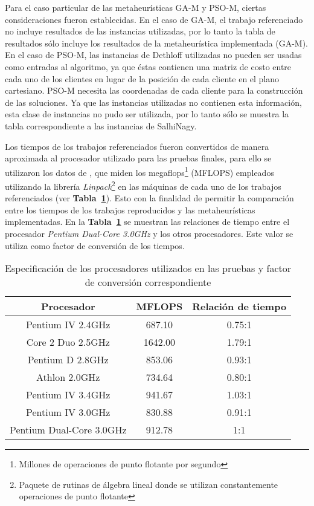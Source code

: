 Para el caso particular de las metaheurísticas GA-M y PSO-M, ciertas consideraciones fueron establecidas. En el caso de GA-M, el trabajo referenciado  no incluye resultados de las instancias utilizadas, por lo tanto la tabla de resultados sólo incluye los resultados de la metaheurística implementada (GA-M). En el caso de PSO-M, las instancias de Dethloff utilizadas no pueden ser usadas como entradas al algoritmo, ya que éstas contienen una matriz de costo entre cada uno de los clientes en lugar de la posición de cada cliente en el plano cartesiano. PSO-M necesita las coordenadas de cada cliente para la construcción de las soluciones. Ya que las instancias utilizadas no contienen esta información, esta clase de instancias no pudo ser utilizada, por lo tanto sólo se muestra la tabla correspondiente a las instancias de SalhiNagy.

Los tiempos de los trabajos referenciados fueron convertidos de manera aproximada al procesador utilizado para las pruebas finales, para ello se utilizaron los datos de \cite{website:maquinas}, que miden los megaflops\footnote{Millones de operaciones de punto flotante por segundo} (MFLOPS) empleados utilizando la librería \emph{Linpack}\footnote{Paquete de rutinas de álgebra lineal donde se utilizan constantemente operaciones de punto flotante} en las máquinas de cada uno de los trabajos re\-fe\-ren\-cia\-dos (ver \textbf{Tabla~\ref{table:comparacion-procesadores}}). Esto con la finalidad de permitir la comparación entre los tiempos de los trabajos reproducidos y las metaheurísticas implementadas. En la \textbf{Tabla~\ref{table:comparacion-procesadores}} se muestran las relaciones de tiempo entre el procesador \emph{Pentium Dual-Core 3.0GHz} y los otros procesadores. Este valor se utiliza como factor de conversión de los tiempos.\\

\begin{table}[h]
\centering
\footnotesize
\caption{Especificación de los procesadores utilizados en las pruebas y factor de conversión correspondiente}
\begin{tabular}{ c | c || c }
\hline\hline
\textbf{Procesador} & \textbf{MFLOPS} & \textbf{Relación de tiempo}\\ \hline\hline
Pentium IV 2.4GHz & 687.10 & 0.75:1\\
Core 2 Duo 2.5GHz & 1642.00 & 1.79:1\\
Pentium D 2.8GHz & 853.06 & 0.93:1\\
Athlon 2.0GHz & 734.64 & 0.80:1\\
Pentium IV 3.4GHz & 941.67 & 1.03:1\\
Pentium IV 3.0GHz & 830.88 & 0.91:1\\ \hline
Pentium Dual-Core 3.0GHz & 912.78 & 1:1\\
\hline\hline
\end{tabular}
\label{table:comparacion-procesadores}
\end{table}

